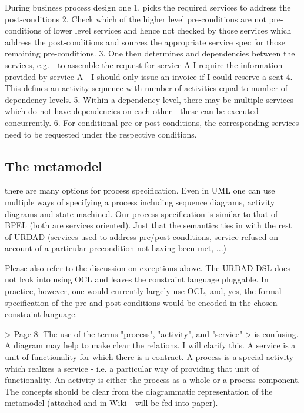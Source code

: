 During business process design one
  1. picks the required services to address the post-conditions
  2. Check which of the higher level pre-conditions are not pre-conditions of lower level services and hence not checked by those services which address the post-conditions and sources the appropriate service spec for those remaining pre-conditions.
  3. One then determines and dependencies between the services, e.g. 
    - to assemble the request for service A I require the information provided by service A
    - I should only issue an invoice if I could reserve a seat
  4. This defines an activity sequence with number of activities equal to number of dependency levels.
  5. Within a dependency level, there may be multiple services which do not have dependencies on each other - these can be executed concurrently.
  6. For conditional pre-or post-conditions, the corresponding services need to be requested under the respective conditions.

\subsection{The metamodel}








there are many options for process specification. Even in UML one can use multiple ways of specifying a process including sequence diagrams, activity diagrams and state machined. Our process specification is similar to that of BPEL (both are services oriented). Just that the semantics ties in with the rest of URDAD (services used to address pre/post conditions, service refused on account of a particular precondition not having been met, ...)

Please also refer to the discussion on exceptions above. The URDAD DSL does not lcok into using OCL and leaves the constraint language pluggable. In practice, however, one would currently largely use OCL, and, yes, the formal specification of the pre and post conditions would be encoded in the chosen constraint language.

> Page 8: The use of the terms "process", "activity", and "service"
> is confusing. A diagram may help to make clear the relations.
I will clarify this. A service is a unit of functionality for which there is a contract. A process is a special activity which realizes a service - i.e. a particular way of providing that unit of functionality. An activity is either the process as a whole or a process component. The concepts should be clear from the diagrammatic representation of the metamodel (attached and in Wiki - will be fed into paper).

